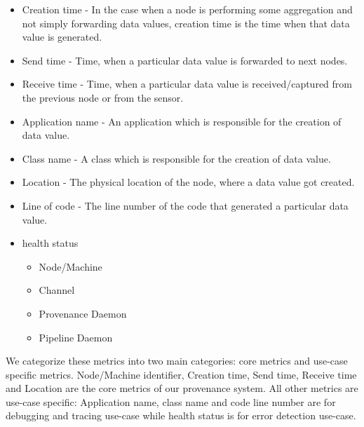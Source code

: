 \begin{itemize}
\begin{itemize}
			\item Creation time - In the case when a node is performing some aggregation and not simply forwarding data values, creation time is the time when that data value is generated.
			\item Send time - Time, when a particular data value is forwarded to next nodes.
			\item Receive time - Time, when a particular data value is received/captured from the previous node or from the sensor.
			\item Application name - An application which is responsible for the creation of data value.
			\item Class name - A class which is responsible for the creation of data value.
			\item Location - The physical location of the node, where a data value got created.
			\item Line of code - The line number of the code that generated a particular data value.
			\item health status
				\begin{itemize}
					\item Node/Machine
					\item Channel
					\item Provenance Daemon
					\item Pipeline Daemon
				\end{itemize}		
		\end{itemize}
We categorize these metrics into two main categories: core metrics and use-case specific metrics. Node/Machine identifier, Creation time, Send time, Receive time and Location are the core metrics of our provenance system. All other metrics are use-case specific: Application name, class name and code line number are for debugging and tracing use-case while health status is for error detection use-case.


\end{itemize}
